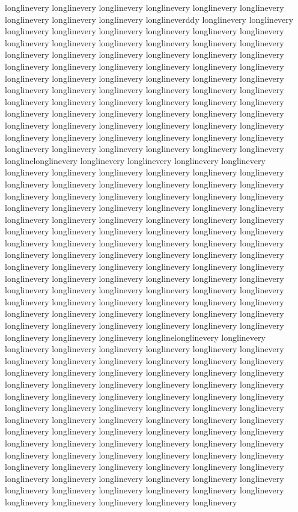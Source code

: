 {longlinevery longlinevery longlinevery longlinevery longlinevery longlinevery longlinevery longlinevery longlinevery longlineverddy longlinevery longlinevery longlinevery longlinevery longlinevery longlinevery longlinevery longlinevery longlinevery longlinevery longlinevery longlinevery longlinevery longlinevery longlinevery longlinevery longlinevery longlinevery longlinevery longlinevery longlinevery longlinevery longlinevery longlinevery longlinevery longlinevery longlinevery longlinevery longlinevery longlinevery longlinevery longlinevery longlinevery longlinevery longlinevery longlinevery longlinevery longlinevery longlinevery longlinevery longlinevery longlinevery longlinevery longlinevery longlinevery longlinevery longlinevery longlinevery longlinevery longlinevery longlinevery longlinevery longlinevery longlinevery longlinevery longlinevery longlinevery longlinevery longlinevery longlinevery longlinevery longlinevery longlinevery longlinevery longlinevery longlinevery longlinevery longlinevery longlinelonglinevery longlinevery longlinevery longlinevery longlinevery longlinevery longlinevery longlinevery longlinevery longlinevery longlinevery longlinevery longlinevery longlinevery longlinevery longlinevery longlinevery longlinevery longlinevery longlinevery longlinevery longlinevery longlinevery longlinevery longlinevery longlinevery longlinevery longlinevery longlinevery longlinevery longlinevery longlinevery longlinevery longlinevery longlinevery longlinevery longlinevery longlinevery longlinevery longlinevery longlinevery longlinevery longlinevery longlinevery longlinevery longlinevery longlinevery longlinevery longlinevery longlinevery longlinevery longlinevery longlinevery longlinevery longlinevery longlinevery longlinevery longlinevery longlinevery longlinevery longlinevery longlinevery longlinevery longlinevery longlinevery longlinevery longlinevery longlinevery longlinevery longlinevery longlinevery longlinevery longlinevery longlinevery longlinevery longlinevery longlinevery longlinevery longlinevery longlinevery longlinevery longlinevery longlinevery longlinevery longlinevery longlinevery longlinevery longlinevery longlinevery longlinevery longlinevery longlinevery longlinelonglinevery longlinevery longlinevery longlinevery longlinevery longlinevery longlinevery longlinevery longlinevery longlinevery longlinevery longlinevery longlinevery longlinevery longlinevery longlinevery longlinevery longlinevery longlinevery longlinevery longlinevery longlinevery longlinevery longlinevery longlinevery longlinevery longlinevery longlinevery longlinevery longlinevery longlinevery longlinevery longlinevery longlinevery longlinevery longlinevery longlinevery longlinevery longlinevery longlinevery longlinevery longlinevery longlinevery longlinevery longlinevery longlinevery longlinevery longlinevery longlinevery longlinevery longlinevery longlinevery longlinevery longlinevery longlinevery longlinevery longlinevery longlinevery longlinevery longlinevery longlinevery longlinevery longlinevery longlinevery longlinevery longlinevery longlinevery longlinevery longlinevery longlinevery longlinevery longlinevery longlinevery longlinevery longlinevery longlinevery longlinevery longlinevery longlinevery longlinevery longlinevery longlinevery longlinevery longlinevery longlinevery }
